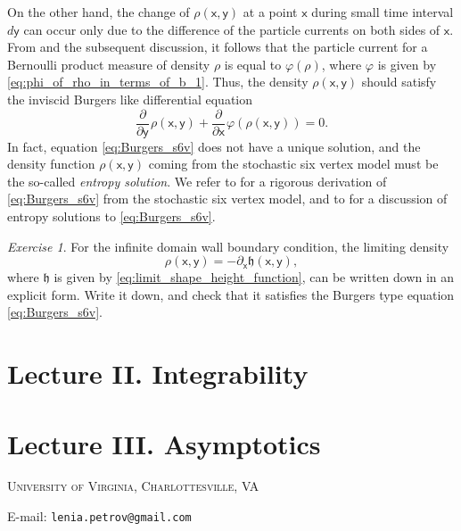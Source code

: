 \documentclass[letterpaper,11pt,oneside,reqno]{article}
\numberwithin{equation}{section}
\newcommand{\ssp}{\hspace{1pt}}
\theoremstyle{definition}
\theoremstyle{remark}
\newtheorem{exercise}{Exercise}[section]
\begin{document}
On the other hand, the change of
$\rho(\mathsf{x},\mathsf{y})$
at a point $\mathsf{x}$ during small time interval 
$d\mathsf{y}$ can occur only due to the difference of the particle currents
on both sides of $\mathsf{x}$. From 
and the subsequent discussion, it follows that the 
particle current for a Bernoulli product measure of density $\rho$ is equal to $\varphi(\rho)$,
where $\varphi$ is given by \eqref{eq:phi_of_rho_in_terms_of_b_1}.
Thus, the density $\rho(\mathsf{x},\mathsf{y})$ should satisfy the
inviscid Burgers like
differential equation
\begin{equation}
	\label{eq:Burgers_s6v}
	\frac{\partial}{\partial\mathsf{y}}\ssp 
	\rho(\mathsf{x},\mathsf{y})+
	\frac{\partial}{\partial\mathsf{x}}\ssp
	\varphi\left( \rho(\mathsf{x},\mathsf{y}) \right) =0.
\end{equation}
In fact, equation \eqref{eq:Burgers_s6v}
does not have a unique solution, and the density function $\rho(\mathsf{x},\mathsf{y})$
coming from the stochastic six vertex model must be the so-called \emph{entropy solution}.
We refer to 
\cite[Theorem 1.1]{aggarwal2020limit}
for a rigorous derivation of \eqref{eq:Burgers_s6v} from the stochastic six vertex model,
and to 
\cite[Section 2.3]{serre1999systems} for a discussion of entropy solutions to \eqref{eq:Burgers_s6v}.

\begin{exercise}
	For the infinite domain wall boundary condition,
	the limiting 
	density
	\begin{equation*}
		\rho(\mathsf{x},\mathsf{y})=-\partial_\mathsf{x} \mathfrak{h}(\mathsf{x},\mathsf{y}),
	\end{equation*}
	where $\mathfrak{h}$ is 
	given by \eqref{eq:limit_shape_height_function},
	can be written down in an explicit form.
	Write it down, and check that it satisfies the Burgers type equation \eqref{eq:Burgers_s6v}.
\end{exercise}


\newpage
\section{Lecture II. Integrability}
\label{sec:integrability}





\newpage
\section{Lecture III. Asymptotics}
\label{sec:asymptotics}







\newpage



\medskip

\textsc{University of Virginia, Charlottesville, VA}

E-mail: \texttt{lenia.petrov@gmail.com}
\end{document}
